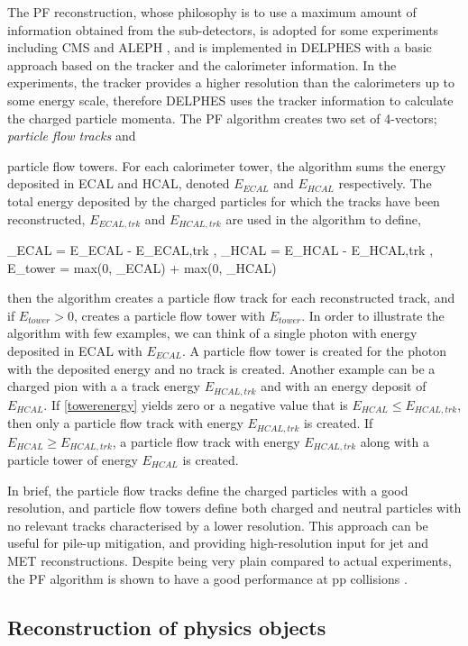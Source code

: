 The PF reconstruction, whose philosophy is to use a maximum amount of information obtained from the sub-detectors, is adopted for some experiments including CMS \cite{CMS-PAS-PFT-09-001} and ALEPH \cite{ALEPH:1994ayc}, and is implemented in DELPHES with a basic approach based on the tracker and the calorimeter information. In the experiments, the tracker provides a higher resolution than the calorimeters up to some energy scale, therefore DELPHES uses the tracker information to calculate the charged particle momenta. The PF algorithm creates two set of 4-vectors; \emph{particle flow tracks} and {particle flow towers. For each calorimeter tower, the algorithm sums the energy deposited in ECAL and HCAL, denoted $E_{ECAL}$ and $E_{HCAL}$ respectively. The total energy deposited by the charged particles for which the tracks have been reconstructed, $E_{ECAL,trk}$ and $E_{HCAL,trk}$ are used in the algorithm to define,

\be
\Delta_{ECAL} = E_{ECAL} - E_{ECAL,trk} \; , \; \Delta_{HCAL} = E_{HCAL} - E_{HCAL,trk} \; ,
\ee
\be
E_{tower} = max(0, \Delta_{ECAL}) + max(0, \Delta_{HCAL})
\label{towerenergy}
\ee

then the algorithm creates a particle flow track for each reconstructed track, and if $E_{tower} > 0$, creates a particle flow tower with $E_{tower}$. In order to illustrate the algorithm with few examples, we can think of a single photon with energy deposited in ECAL with $E_{ECAL}$. A particle flow tower is created for the photon with the deposited energy and no track is created. Another example can be a charged pion with a a track energy $E_{HCAL,trk}$ and with an energy deposit of $E_{HCAL}$. If \autoref{towerenergy} yields zero or a negative value that is $E_{HCAL}\leq E_{HCAL,trk}$, then only a particle flow track with energy $E_{HCAL,trk}$ is created. If $E_{HCAL}\geq E_{HCAL,trk}$, a particle flow track with energy $E_{HCAL,trk}$ along with a particle tower of energy $E_{HCAL}$ is created.

In brief, the particle flow tracks define the charged particles with a good resolution, and particle flow towers define both charged and neutral particles with no relevant tracks characterised by a lower resolution. This approach can be useful for pile-up mitigation, and providing high-resolution input for jet and MET reconstructions. Despite being very plain compared to actual experiments, the PF algorithm is shown to have a good performance at pp collisions \cite{deFavereau2014}. 

\subsection{Reconstruction of physics objects}

}
